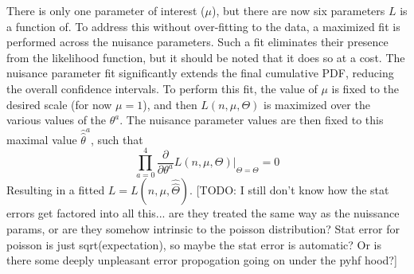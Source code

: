     There is only one parameter of interest ($\mu$), but there are now six parameters $L$ is a function of.
    To address this without over-fitting to the data, a maximized fit is performed across the nuisance parameters.
    Such a fit eliminates their presence from the likelihood function, but it should be noted that it does so at a cost.
    The nuisance parameter fit significantly extends the final cumulative PDF, reducing the overall confidence intervals.
    To perform this fit, the value of $\mu$ is fixed to the desired scale (for now $\mu=1$),
        and then $L(n,\mu,\Theta)$ is maximized over the various values of the $\theta^a$.
    The nuisance parameter values are then fixed to this maximal value $\hat{\hat\theta}^a$, such that
    \begin{equation}
        \prod \limits_{a=0}^{4} \frac{\partial}{\partial \theta^a} L(n,\mu,\Theta) |_{\Theta=\hat{\hat\Theta}} = 0
    \end{equation}
    Resulting in a fitted $L = L(n,\mu,\hat{\hat\Theta})$.
    [TODO: I still don't know how the stat errors get factored into all this...
        are they treated the same way as the nuissance params,
        or are they somehow intrinsic to the poisson distribution?
    Stat error for poisson is just sqrt(expectation),
        so maybe the stat error is automatic?
    Or is there some deeply unpleasant error propogation going on under the pyhf hood?]
        
